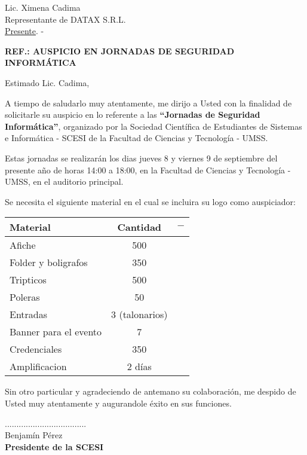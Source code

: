 \documentclass[letterpaper,12pt]{letter}
\begin{document}
\date {11 de agosto de 2011}

\begin{letter}{Lic. Ximena Cadima \\ Representante de DATAX S.R.L. \\\underline {Presente}. -}

\begin{center}
	\opening{\textbf{REF.: AUSPICIO EN JORNADAS DE SEGURIDAD INFORM\'ATICA}}
\end{center}

Estimado Lic. Cadima,

A tiempo de saludarlo muy atentamente, me dirijo a Usted con la finalidad de solicitarle su auspicio en lo referente 
a las {\bfseries ``Jornadas de Seguridad Inform\'atica''}, organizado por la Sociedad Cient\'ifica de Estudiantes de 
Sistemas e Inform\'atica - SCESI de la Facultad de Ciencias y Tecnolog\'ia - UMSS.

Estas jornadas se realizar\'an los dias jueves 8 y viernes 9 de septiembre del presente a\~no de horas 14:00 a 
18:00, en la Facultad de Ciencias y Tecnolog\'ia - UMSS, en el auditorio principal.

Se necesita el siguiente material en el cual se incluira su logo como auspiciador:

\begin{tabular}{|l|c|c|}
\hline
{\bfseries Material} & {\bfseries Cantidad} & $-$ \\
\hline
Afiche & 500 & \\
\hline
Folder y boligrafos & 350 & \\
\hline
Tripticos & 500 & \\
\hline
Poleras & 50 & \\
\hline
Entradas & 3 (talonarios) & \\
\hline
Banner para el evento & 7 & \\
\hline
Credenciales & 350 & \\
\hline
Amplificacion & 2 d\'ias & \\
\hline
\end{tabular}

Sin otro particular y agradeciendo de antemano su colaboraci\'on, me despido de Usted muy atentamente y augurandole \'exito en sus funciones.\\

\vspace{1cm}

\begin{center}
...................................\\
Benjam\'in P\'erez\\
{\bfseries Presidente de la  SCESI}
\end{center}

\end{letter}
\end{document}
